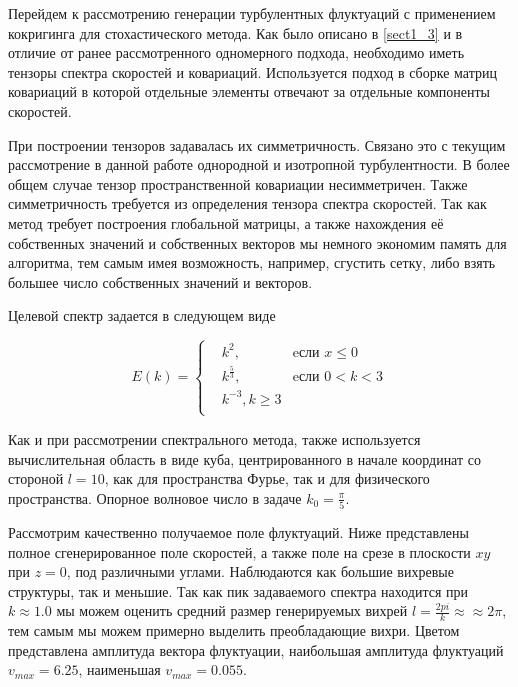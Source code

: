 Перейдем к рассмотрению генерации турбулентных флуктуаций с применением кокригинга для стохастического метода. Как было описано в \ref{sect1_3} и в отличие от ранее рассмотренного одномерного подхода, необходимо иметь тензоры спектра скоростей и ковариаций. Используется подход в сборке матриц ковариаций в которой отдельные элементы отвечают за отдельные компоненты скоростей.

При построении тензоров задавалась их симметричность. Связано это с текущим рассмотрение в данной работе однородной и изотропной турбулентности. В более общем случае тензор пространственной ковариации несимметричен. Также симметричность требуется из определения тензора спектра скоростей. Так как метод требует построения глобальной матрицы, а также нахождения её собственных значений и собственных векторов мы немного экономим память для алгоритма, тем самым имея возможность, например, сгустить сетку, либо взять большее число собственных значений и векторов.

Целевой спектр задается в следующем виде

\[
    E(k) = \left\{
    \begin{alignedat}{2}
        &k^2, \quad &\text{eсли } x\leqslant 0 \\
        &k^{\frac{5}{3}}, \quad & \text{eсли } 0 < k < 3 \\
        &k^{-3}, k \geqslant 3 \\
    \end{alignedat}
    \right.
\]

Как и при рассмотрении спектрального метода, также используется вычислительная область в виде куба, центрированного в начале координат со стороной $l=10$, как для пространства Фурье, так и для физического пространства. Опорное волновое число в задаче $k_0=\frac{\pi}{5}$.  

Рассмотрим качественно получаемое поле флуктуаций. Ниже представлены полное сгенерированное поле скоростей, а также поле на срезе в плоскости $xy$ при $z = 0$, под различными углами. Наблюдаются как большие вихревые структуры, так и меньшие. Так как пик задаваемого спектра находится при $k \approx 1.0$ мы можем оценить средний размер генерируемых вихрей $ l = \frac{2 pi}{k} \approx \approx 2 \pi$, тем самым мы можем примерно выделить преобладающие вихри. Цветом представлена амплитуда вектора флуктуации, наибольшая амплитуда флуктуаций $v_{max} = 6.25$, наименьшая $v_{max} = 0.055$.  

